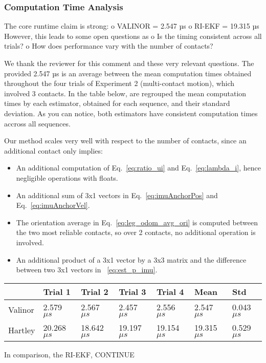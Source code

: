 \subsubsection{Computation Time Analysis}

\begin{revquote}
The core runtime claim is strong:
      o VALINOR = 2.547 µs
      o RI-EKF = 19.315 µs
However, this leads to some open questions as
      o Is the timing consistent across all trials?
      o How does performance vary with the number of contacts?
    
\end{revquote}

We thank the reviewer for this comment and these very relevant questions. The provided 2.547 µs is an average between the mean computation times obtained throughout the four trials of Experiment 2 (multi-contact motion), which involved 3 contacts. In the table below, are regrouped the mean computation times by each estimator, obtained for each sequence, and their standard deviation. As you can notice, both estimators have consistent computation times accross all sequences. 

Our method scales very well with respect to the number of contacts, since an additional contact only implies:
\begin{itemize}
  \item An additional computation of Eq.~\eqref{eq:ratio_ui} and Eq.~\eqref{eq:lambda_i}, hence negligible operations with floats.
  \item An additional sum of 3x1 vectors in Eq.~\eqref{eq:imuAnchorPos} and Eq.~\eqref{eq:imuAnchorVel}.
  \item The orientation average in Eq.~\eqref{eq:leg_odom_avg_ori} is computed between the two most reliable contacts, so over 2 contacts, no additional operation is involved. 
  \item An additional product of a 3x1 vector by a 3x3 matrix and the difference between two 3x1 vectors in 
  ~\eqref{eq:est_p_imu}.
\end{itemize}

\begin{table}[!h]
  \begin{center}
        \begin{tabu}to\linewidth{| X[c] | X[c] | X[c] | X[c] | X[c] | X[c] | X[c] | }
            \hline
              & Trial 1 & Trial 2 & Trial 3 & Trial 4 & Mean & Std \\
            \hline
             Valinor & 2.579 $\mu s$  & 2.567 $\mu s$  & 2.457 $\mu s$  & 2.556 $\mu s$  & 2.547 $\mu s$ & 0.043 $\mu s$ \\
             \hline 
             Hartley & 20.268 $\mu s$ & 18.642 $\mu s$ & 19.197 $\mu s$ & 19.154 $\mu s$ & 19.315 $\mu s$ & 0.529 $\mu s$ \\
            \hline     
        \end{tabu}
    \end{center}
\end{table}

In comparison, the RI-EKF, \alert{CONTINUE}